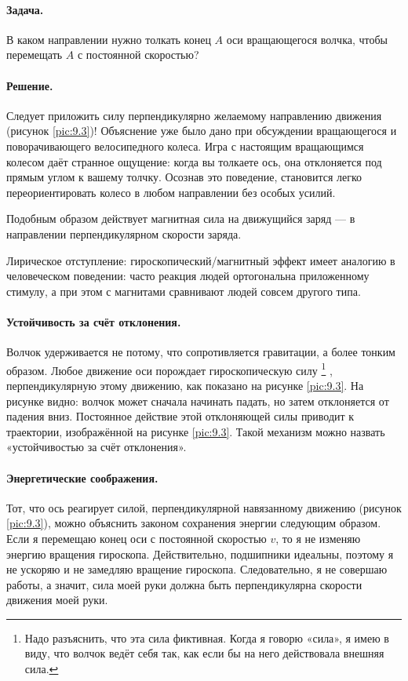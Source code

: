 \paragraph{Задача.}
В каком направлении нужно толкать конец $A$ оси вращающегося волчка, чтобы перемещать $A$ с постоянной скоростью?

\paragraph{Решение.}
Следует приложить силу перпендикулярно желаемому направлению движения (рисунок \ref{pic:9.3})!
Объяснение уже было дано при обсуждении вращающегося и поворачивающего велосипедного колеса.
Игра с настоящим вращающимся колесом даёт странное ощущение: когда вы толкаете ось, она отклоняется под прямым углом к вашему толчку.
Осознав это поведение, становится легко переориентировать колесо в любом направлении без особых усилий.

Подобным образом действует магнитная сила на движущийся заряд --- в направлении перпендикулярном скорости заряда.

Лирическое отступление:
гироскопический/магнитный эффект имеет аналогию в человеческом поведении: часто реакция людей ортогональна приложенному стимулу, а при этом с магнитами сравнивают людей совсем другого типа.

\paragraph{Устойчивость за счёт отклонения.}
Волчок удерживается не потому, что сопротивляется гравитации, а более тонким образом.
Любое движение оси порождает гироскопическую силу%
\footnote{Надо разъяснить, что эта сила фиктивная.
Когда я говорю «сила», я имею в виду, что волчок ведёт себя так, как если бы на него действовала внешняя сила.}%
, перпендикулярную этому движению, как показано на рисунке \ref{pic:9.3}.
На рисунке видно: волчок может сначала начинать падать, но затем отклоняется от падения вниз.
Постоянное действие этой отклоняющей силы приводит к траектории, изображённой на рисунке \ref{pic:9.3}.
Такой механизм можно назвать «устойчивостью за счёт отклонения».

\paragraph{Энергетические соображения.}
Тот, что ось реагирует силой, перпендикулярной навязанному движению (рисунок \ref{pic:9.3}), можно объяснить законом сохранения энергии следующим образом.
Если я перемещаю конец оси с постоянной скоростью $v$, то я не изменяю энергию вращения гироскопа.
Действительно, подшипники идеальны, поэтому я не ускоряю и не замедляю вращение гироскопа.
Следовательно, я не совершаю работы, а значит, сила моей руки должна быть перпендикулярна скорости движения моей руки.

